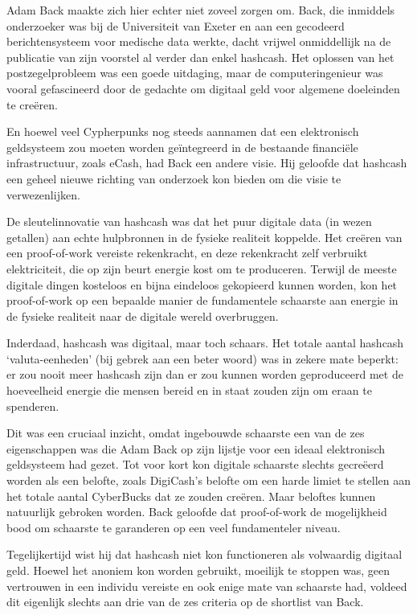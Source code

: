 \documentclass[smalldemyvopaper,11pt,twoside,onecolumn,openright,extrafontsizes,hidelinks]{memoir}
\begin{document}
Adam Back maakte zich hier echter niet zoveel zorgen om. Back, die
inmiddels onderzoeker was bij de Universiteit van Exeter en aan een
gecodeerd berichtensysteem voor medische data werkte, dacht vrijwel
onmiddellijk na de publicatie van zijn voorstel al verder dan enkel
hashcash. Het oplossen van het postzegelprobleem was een goede
uitdaging, maar de computeringenieur was vooral gefascineerd door de
gedachte om digitaal geld voor algemene doeleinden te creëren.

En hoewel veel Cypherpunks nog steeds aannamen dat een elektronisch
geldsysteem zou moeten worden geïntegreerd in de bestaande financiële
infrastructuur, zoals eCash, had Back een andere visie. Hij geloofde dat
hashcash een geheel nieuwe richting van onderzoek kon bieden om die
visie te verwezenlijken.

De sleutelinnovatie van hashcash was dat het puur digitale data (in
wezen getallen) aan echte hulpbronnen in de fysieke realiteit koppelde.
Het creëren van een proof-of-work vereiste rekenkracht, en deze
rekenkracht zelf verbruikt elektriciteit, die op zijn beurt energie kost
om te produceren. Terwijl de meeste digitale dingen kosteloos en bijna
eindeloos gekopieerd kunnen worden, kon het proof-of-work op een
bepaalde manier de fundamentele schaarste aan energie in de fysieke
realiteit naar de digitale wereld overbruggen.

Inderdaad, hashcash was digitaal, maar toch schaars. Het totale aantal
hashcash `valuta-eenheden' (bij gebrek aan een beter woord) was in
zekere mate beperkt: er zou nooit meer hashcash zijn dan er zou kunnen
worden geproduceerd met de hoeveelheid energie die mensen bereid en in
staat zouden zijn om eraan te spenderen.

Dit was een cruciaal inzicht, omdat ingebouwde schaarste een van de zes
eigenschappen was die Adam Back op zijn lijstje voor een ideaal
elektronisch geldsysteem had gezet. Tot voor kort kon digitale schaarste
slechts gecreëerd worden als een belofte, zoals DigiCash's belofte om
een harde limiet te stellen aan het totale aantal CyberBucks dat ze
zouden creëren. Maar beloftes kunnen natuurlijk gebroken worden. Back
geloofde dat proof-of-work de mogelijkheid bood om schaarste te
garanderen op een veel fundamenteler niveau.

Tegelijkertijd wist hij dat hashcash niet kon functioneren als
volwaardig digitaal geld. Hoewel het anoniem kon worden gebruikt,
moeilijk te stoppen was, geen vertrouwen in een individu vereiste en ook
enige mate van schaarste had, voldeed dit eigenlijk slechts aan drie van
de zes criteria op de shortlist van Back.
\end{document}
